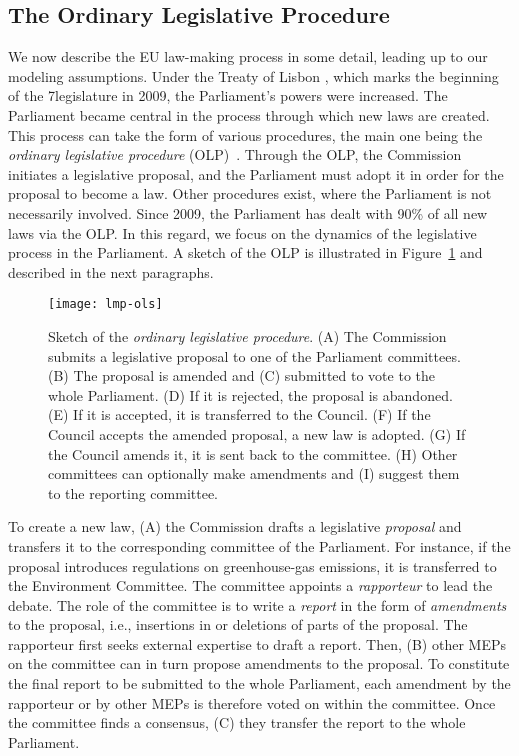 \subsection{The Ordinary Legislative Procedure}

We now describe the EU law-making process in some detail, leading up to our modeling assumptions.
Under the Treaty of Lisbon \cite{eu2007lisbon}, which marks the beginning of the 7\th legislature in 2009, the Parliament's powers were increased.
The Parliament became central in the process through which new laws are created.
This process can take the form of various procedures, the main one being the \textit{ordinary legislative procedure} (OLP)~\cite{europarl2018ordinary}.
Through the OLP, the Commission initiates a legislative proposal, and the Parliament must adopt it in order for the proposal to become a law.
Other procedures exist, where the Parliament is not necessarily involved.
Since 2009, the Parliament has dealt with 90\% of all new laws via the OLP.
In this regard, we focus on the dynamics of the legislative process in the Parliament.
A sketch of the OLP is illustrated in Figure~\ref{lmp:fig:ols} and described in the next paragraphs.

\begin{figure}
  \centering
	\texttt{[image: lmp-ols]}
	\caption{
		Sketch of the \textit{ordinary legislative procedure}.
		(A) The Commission submits a legislative proposal to one of the Parliament committees.
		(B) The proposal is amended and (C) submitted to vote to the whole Parliament.
		(D) If it is rejected, the proposal is abandoned.
		(E) If it is accepted, it is transferred to the Council.
		(F) If the Council accepts the amended proposal, a new law is adopted.
		(G) If the Council amends it, it is sent back to the committee.
		(H) Other committees can optionally make amendments and (I) suggest them to the reporting committee.
	}
	\label{lmp:fig:ols}
\end{figure}

To create a new law, (A) the Commission drafts a legislative \textit{proposal} and transfers it to the corresponding committee of the Parliament.
For instance, if the proposal introduces regulations on greenhouse-gas emissions, it is transferred to the Environment Committee.
The committee appoints a \textit{rapporteur} to lead the debate.
The role of the committee is to write a \textit{report} in the form of \textit{amendments} to the proposal, i.e., insertions in or deletions of parts of the proposal.
The rapporteur first seeks external expertise to draft a report.
Then, (B) other MEPs on the committee can in turn propose amendments to the proposal.
To constitute the final report to be submitted to the whole Parliament, each amendment by the rapporteur or by other MEPs is therefore voted on within the committee.
Once the committee finds a consensus, (C) they transfer the report to the whole Parliament.

